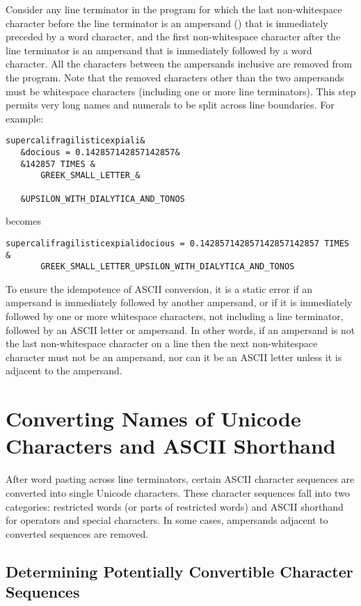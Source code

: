 Consider any line terminator in the program
for which the last non-whitespace character before the line terminator
is an ampersand (\txt{\&}) that is immediately preceded by a word character,
and the first non-whitespace character after the line terminator
is an ampersand that is immediately followed by a word character.
All the characters between the ampersands inclusive
are removed from the program.
Note that the removed characters other than the two ampersands
must be whitespace characters
(including one or more line terminators).
This step permits very long names and numerals
to be split across line boundaries.
For example:

\begin{verbatim}
supercalifragilisticexpiali&
   &docious = 0.142857142857142857&
   &142857 TIMES &
       GREEK_SMALL_LETTER_&

   &UPSILON_WITH_DIALYTICA_AND_TONOS
\end{verbatim}
becomes
\begin{verbatim}
supercalifragilisticexpialidocious = 0.142857142857142857142857 TIMES &
       GREEK_SMALL_LETTER_UPSILON_WITH_DIALYTICA_AND_TONOS
\end{verbatim}

To ensure the idempotence of ASCII conversion,
it is a static error if
an ampersand is immediately followed by another ampersand,
or if it is immediately followed
by one or more whitespace characters,
not including a line terminator,
followed by an ASCII letter or ampersand.
In other words,
if an ampersand is not the last non-whitespace character on a line
then the next non-whitespace character must not be an ampersand,
nor can it be an ASCII letter
unless it is adjacent to the ampersand.


\section{Converting Names of Unicode Characters and ASCII Shorthand}

After word pasting across line terminators,
certain ASCII character sequences are converted
into single Unicode characters.
These character sequences fall into two categories:
restricted words (or parts of restricted words)
and ASCII shorthand for operators and special characters.
In some cases,
ampersands adjacent to converted sequences are removed.

\subsection{Determining Potentially Convertible Character Sequences}

